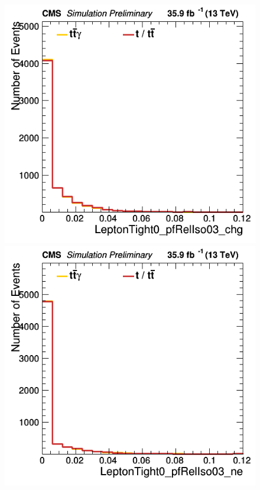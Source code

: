 \documentclass[11pt]{scrartcl}
\begin{document}
	\begin{figure}[H]
	\centering
	\begin{minipage}{.5\textwidth}
	  \centering
	  \includegraphics[width=0.75\linewidth]{figures/Notused/LeptonTight0_pfRelIso03_chg.png}
	\end{minipage}%
	\begin{minipage}{.5\textwidth}
	  \centering
	  \includegraphics[width=0.75\linewidth]{figures/Notused/LeptonTight0_pfRelIso03_ne.png}
	\end{minipage}
	\end{figure}
	
\end{document}
